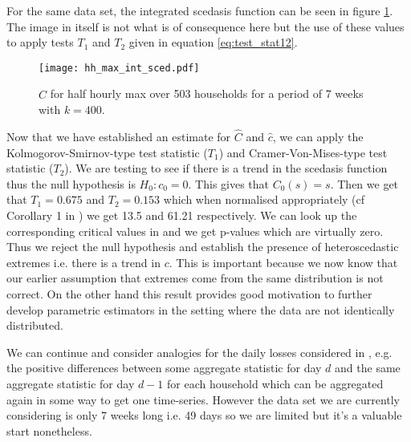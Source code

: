For the same data set, the integrated scedasis function can be seen in figure \ref{fig:myintsced_hh_max}. The image in itself is not what is of consequence here but the use of these values to apply tests $T_1$ and $T_2$ given in equation \ref{eq:test_stat12}.

\begin{figure}
\centering
\texttt{[image: hh\_max\_int\_sced.pdf]}
\caption{\label{fig:myintsced_hh_max} $\hat{C}$ for half hourly max over 503 households for a period of 7 weeks with $k=400$.}
\end{figure}

Now that we have established an estimate for $\hat{C}$ and $\hat{c}$, we can apply the Kolmogorov-Smirnov-type test statistic ($T_1$) and Cramer-Von-Mises-type test statistic ($T_2$). We are testing to see if there is a trend in the scedasis function thus the null hypothesis is $H_0: c_0 =0$. This gives that $C_0(s) = s$. Then we get that $T_1 = 0.675$ and $T_2 = 0.153$ which when normalised appropriately (cf Corollary 1 in \citet{einmahl16}) we get 13.5 and 61.21 respectively. We can look up the corresponding critical values in \citet{tables1,tables2} and we get p-values which are virtually zero. Thus we reject the null hypothesis and establish the presence of heteroscedastic extremes i.e. there is a trend in $c$. This is important because we now know that our earlier assumption that extremes come from the same distribution is not correct. On the other hand this result provides good motivation to further develop parametric estimators in the setting where the data are not identically distributed.

We can continue and consider analogies for the daily losses considered in \cite{einmahl16}, e.g. the positive differences between some aggregate statistic for day $d$ and the same aggregate statistic for day $d-1$ for each household which can be aggregated again in some way to get one time-series. However the data set we are currently considering is only 7 weeks long i.e. 49 days so we are limited but it's a valuable start nonetheless.

